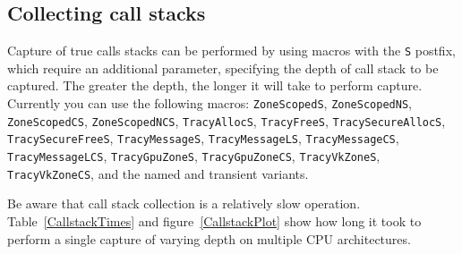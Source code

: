 \documentclass[hidelinks,titlepage,a4paper]{article}
\begin{document}
\subsection{Collecting call stacks}
\label{collectingcallstacks}

Capture of true calls stacks can be performed by using macros with the \texttt{S} postfix, which require an additional parameter, specifying the depth of call stack to be captured. The greater the depth, the longer it will take to perform capture. Currently you can use the following macros: \texttt{ZoneScopedS}, \texttt{ZoneScopedNS}, \texttt{ZoneScopedCS}, \texttt{ZoneScopedNCS}, \texttt{TracyAllocS}, \texttt{TracyFreeS}, \texttt{TracySecureAllocS}, \texttt{TracySecureFreeS}, \texttt{TracyMessageS}, \texttt{TracyMessageLS}, \texttt{TracyMessageCS}, \texttt{TracyMessageLCS}, \texttt{TracyGpuZoneS}, \texttt{TracyGpuZoneCS}, \texttt{TracyVkZoneS}, \texttt{TracyVkZoneCS}, and the named and transient variants.

Be aware that call stack collection is a relatively slow operation. Table~\ref{CallstackTimes} and figure~\ref{CallstackPlot} show how long it took to perform a single capture of varying depth on multiple CPU architectures.
\end{document}
